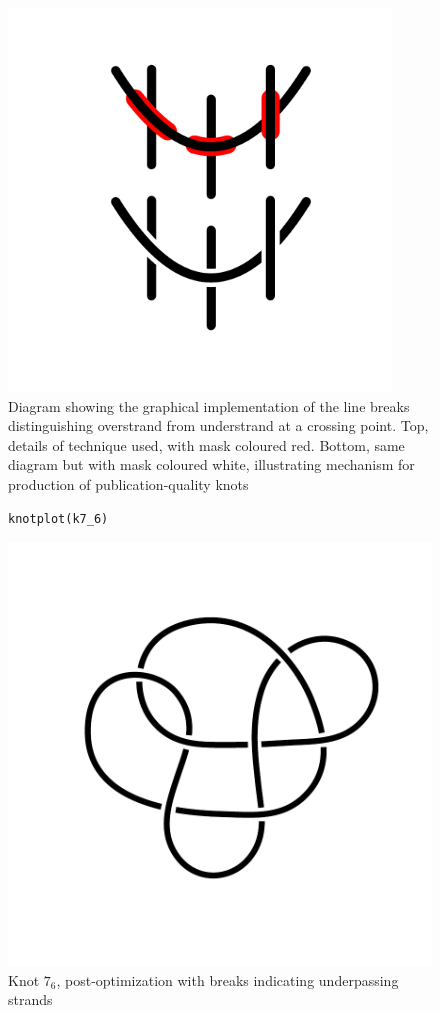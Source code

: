 \documentclass{birkjour}
\theoremstyle{definition}
\theoremstyle{remark}
\numberwithin{equation}{section}
\begin{document}
  
\begin{figure}[!tbp] %
  \centering
\includegraphics[width=4in]{overundergraphicalimplementation}
\caption{Diagram \label{overundergraphicalimplementation} showing the
  graphical implementation of the line breaks distinguishing
  overstrand from understrand at a crossing point.  Top, details of
  technique used, with mask coloured red.  Bottom, same diagram but
  with mask coloured white, illustrating mechanism for production of
  publication-quality knots}
\end{figure}

\begin{figure}[!tbp]
\begin{verbatim}
knotplot(k7_6)
\end{verbatim}
  \centering
\includegraphics[scale = 0.9]{knot-009}%
\caption{Knot $7_6$, post-optimization with breaks indicating
  \label{76_overunder}  underpassing strands}
\end{figure}
\end{document}
